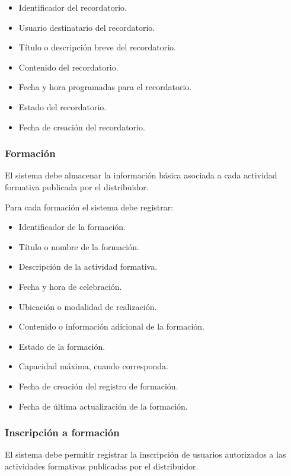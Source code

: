 \begin{itemize}
    \item Identificador del recordatorio.
    \item Usuario destinatario del recordatorio.
    \item Título o descripción breve del recordatorio.
    \item Contenido del recordatorio.
    \item Fecha y hora programadas para el recordatorio.
    \item Estado del recordatorio.
    \item Fecha de creación del recordatorio.
\end{itemize}

\subsubsection*{Formación}

El sistema debe almacenar la información básica asociada a cada actividad formativa publicada por el distribuidor.

Para cada formación el sistema debe registrar:

\begin{itemize}
    \item Identificador de la formación.
    \item Título o nombre de la formación.
    \item Descripción de la actividad formativa.
    \item Fecha y hora de celebración.
    \item Ubicación o modalidad de realización.
    \item Contenido o información adicional de la formación.
    \item Estado de la formación.
    \item Capacidad máxima, cuando corresponda.
    \item Fecha de creación del registro de formación.
    \item Fecha de última actualización de la formación.
\end{itemize}

\subsubsection*{Inscripción a formación}

El sistema debe permitir registrar la inscripción de usuarios autorizados a las actividades formativas publicadas por el distribuidor.

